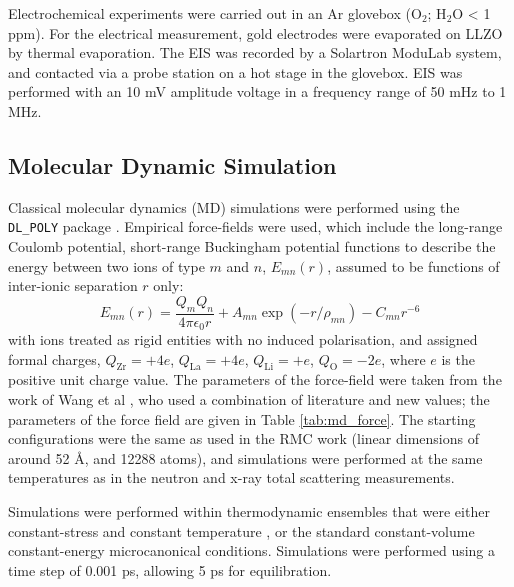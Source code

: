 \documentclass[twoside,twocolumn,9pt]{article}
\begin{document}
Electrochemical experiments were carried out in an Ar glovebox (O$_2$; H$_2$O < 1 ppm). For the electrical measurement,
gold electrodes were evaporated on LLZO by thermal evaporation. The EIS was recorded by a Solartron ModuLab system,
and contacted via a probe station on a hot stage in the glovebox. EIS was performed with an 10 mV amplitude voltage
in a frequency range of 50 mHz to 1 MHz.


\subsection{Molecular Dynamic Simulation}

Classical molecular dynamics (MD) simulations were performed using the \texttt{DL\_POLY} package \cite{Todorov:2006ee}.
Empirical force-fields were used, which include the long-range Coulomb potential,
short-range Buckingham potential functions to describe the energy between two ions of type $m$ and $n$, $E_{mn}(r)$, assumed to be functions of inter-ionic separation $r$ only:
\begin{equation} \label{eq:buckingham}
E_{mn}(r) = \frac{Q_m Q_n}{4 \pi \epsilon_0 r} + A_{mn} \exp(-r/\rho_{mn}) - C_{mn}r^{-6}
\end{equation}
with ions treated as rigid entities with no induced polarisation, and assigned formal charges, $Q_\mathrm{Zr} = +4e$, $Q_\mathrm{La} = +4e$, $Q_\mathrm{Li} = +e$, $Q_\mathrm{O} = -2e$, where $e$ is the positive unit charge value. The parameters of the force-field were taken from the work of Wang et al  \cite{Wang:2014ic}, who used a combination of literature and new values; the parameters of the force field are given in Table \ref{tab:md_force}. The starting configurations were the same as used in the RMC work (linear dimensions of around 52 \AA, and 12288 atoms), and simulations were performed at the same temperatures as in the neutron and x-ray total scattering measurements.

Simulations were performed within thermodynamic ensembles that were either constant-stress \cite{Parrinello:1980kx, Melchionna:2006fi} and constant temperature \cite{Nose:1984bf, Hoover:1985cu}, or the standard constant-volume constant-energy microcanonical conditions. Simulations were performed using a time step of 0.001 ps, allowing 5 ps for equilibration.
\end{document}
